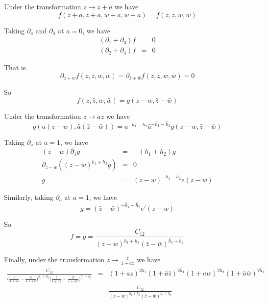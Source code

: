 \documentclass[12pt]{book}
\begin{document}
	Under the transformation $z\rightarrow z+a$ we have
	\begin{equation}
		f(z+a,\bar z+\bar a,w+a,\bar w+\bar a)=f(z,\bar z,w,\bar w)
	\end{equation}
	
	Taking $\partial_a$ and $\partial_{\bar a}$ at $a=0$, we have
	\begin{eqnarray}
		(\partial_1+\partial_3)f&=&0\\
		(\partial_2+\partial_4)f&=&0
	\end{eqnarray}
	
	That is
	\begin{equation}
		\partial_{z+w}f(z,\bar z,w,\bar w)=\partial_{\bar z+\bar w}f(z,\bar z,w,\bar w)=0
	\end{equation}
	
	So
	\begin{equation}
		f(z,\bar z,w,\bar w)=g(z-w,\bar z-\bar w)
	\end{equation}
		
	Under the transformation $z\rightarrow az$ we have
	\begin{equation}
		g(a(z-w),\bar a(\bar z-\bar w))=a^{-h_1-h_2}\bar a^{-\bar h_1 -\bar h_2}g(z-w,\bar z-\bar w)
	\end{equation}
	
	Taking $\partial_a$ at $a=1$, we have
	\begin{eqnarray}
		(z-w)\partial_1g&=&-(h_1+h_2)g\\
		\partial_{z-w}((z-w)^{h_1+h_2}g)&=&0\\
		g&=&(z-w)^{-h_1-h_2}e(\bar z-\bar w)
	\end{eqnarray}
	
	Similarly, taking $\partial_{\bar a}$ at $a=1$, we have
	\begin{equation}
		g=(\bar z-\bar w)^{-\bar h_1-\bar h_2}e'(z-w)
	\end{equation}
	
	So
	\begin{equation}
		f=g=\frac {C_{12}}{(z-w)^{h_1+h_2}(\bar z-\bar w)^{\bar h_1+\bar h_2}}
	\end{equation}
	
	Finally, under the transformation $z\rightarrow \frac z{1+az}$ we have
	\begin{eqnarray}
		\frac {C_{12}}{\big(\frac z{1+az}-\frac w{1+aw}\big)^{h_1+h_2}\big(\frac {\bar z}{1+\bar a\bar z}-\frac {\bar w}{1+\bar a\bar w}\big)^{\bar h_1+\bar h_2}}&=&(1+az)^{2h_1}(1+\bar a\bar z)^{2\bar h_1}(1+aw)^{2h_2}(1+\bar a\bar w)^{2\bar h_2}\nonumber\\
		&&\frac {C_{12}}{(z-w)^{h_1+h_2}(\bar z-\bar w)^{\bar h_1+\bar h_2}}
	\end{eqnarray}
	
\end{document}
